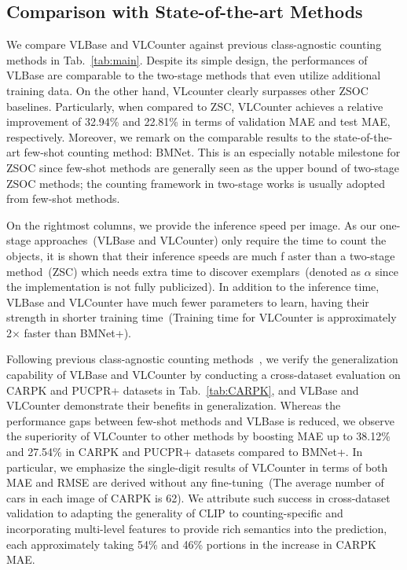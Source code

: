\subsection{Comparison with State-of-the-art Methods}
We compare VLBase and VLCounter against previous class-agnostic counting methods in Tab.~\ref{tab:main}.
Despite its simple design, the performances of VLBase are comparable to the two-stage methods that even utilize additional training data.
On the other hand, VLcounter clearly surpasses other ZSOC baselines.
Particularly, when compared to ZSC, VLCounter achieves a relative improvement of 32.94\% and 22.81\% in terms of validation MAE and test MAE, respectively.
Moreover, we remark on the comparable results to the state-of-the-art few-shot counting method: BMNet.
This is an especially notable milestone for ZSOC since few-shot methods are generally seen as the upper bound of two-stage ZSOC methods; the counting framework in two-stage works is usually adopted from few-shot methods.

On the rightmost columns, we provide the inference speed per image.
As our one-stage approaches~(VLBase and VLCounter) only require the time to count the objects, it is shown that their inference speeds are much f   aster than a two-stage method~(ZSC) which needs extra time to discover exemplars~(denoted as $\alpha$ since the implementation is not fully publicized).
In addition to the inference time, VLBase and VLCounter have much fewer parameters to learn, having their strength in shorter training time~(Training time for VLCounter is approximately 2$\times$ faster than BMNet+).


Following previous class-agnostic counting methods~\cite{2021FAMNet, 2022BMNet}, we verify the generalization capability of VLBase and VLCounter by conducting a cross-dataset evaluation on CARPK and PUCPR+ datasets in Tab.~\ref{tab:CARPK}, and VLBase and VLCounter demonstrate their benefits in generalization.
Whereas the performance gaps between few-shot methods and VLBase is reduced, we observe the superiority of VLCounter to other methods by boosting MAE up to 38.12\% and 27.54\% in CARPK and PUCPR+ datasets compared to BMNet+.
In particular, we emphasize the single-digit results of VLCounter in terms of both MAE and RMSE are derived without any fine-tuning~(The average number of cars in each image of CARPK is 62).
We attribute such success in cross-dataset validation to adapting the generality of CLIP to counting-specific and incorporating multi-level features to provide rich semantics into the prediction, each approximately taking 54\% and 46\% portions in the increase in CARPK MAE.



